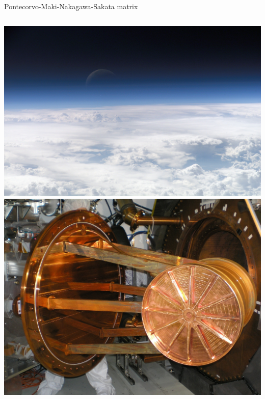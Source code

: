 \documentclass[]{beamer}
\begin{document}
\begin{frame}{Pontecorvo-Maki-Nakagawa-Sakata matrix}{}
\begin{columns}[c]
		\centering
		\includegraphics[width=\textwidth]{defence/atmosphere}
		\centering
		\includegraphics[width=\textwidth]{defence/exo}
	\end{columns}
\end{frame}
\end{document}
